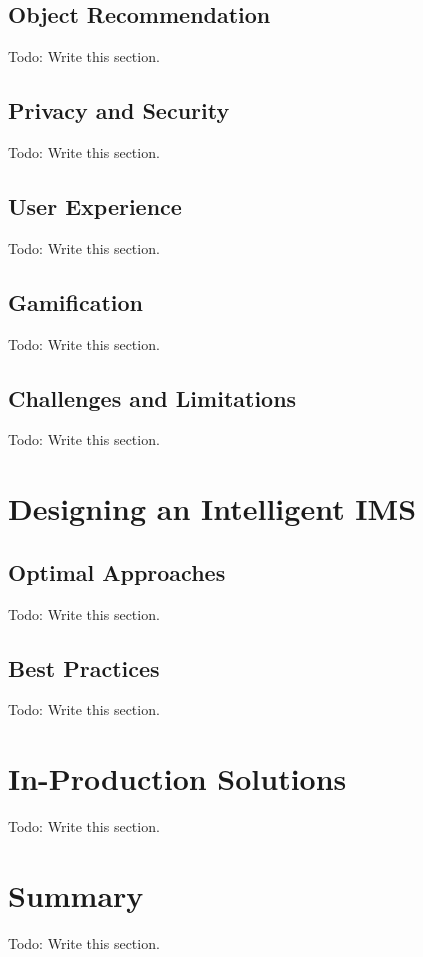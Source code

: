 \subsection{Object Recommendation} \label{subsec:object-recommendation}

Todo: Write this section.

\subsection{Privacy and Security} \label{subsec:privacy-security}

Todo: Write this section.

\subsection{User Experience} \label{subsec:user-experience}

Todo: Write this section.

\subsection{Gamification} \label{subsec:gamification}

Todo: Write this section.

\subsection{Challenges and Limitations} \label{subsec:challenges-limitations}

Todo: Write this section.


\section{Designing an Intelligent IMS} \label{sec:designing-intelligent-ims}

\subsection{Optimal Approaches} \label{subsec:optimal-approaches}

Todo: Write this section.

\subsection{Best Practices} \label{subsec:best-practices}

Todo: Write this section.


\section{In-Production Solutions} \label{sec:on-production-solutions}

Todo: Write this section.


\section{Summary} \label{sec:chapter2-summary}

Todo: Write this section.